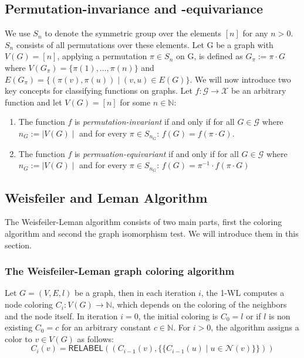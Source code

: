 \documentclass[11pt, dvipsnames, DIV=12]{scrreprt}
\theoremstyle{definition}
\newcommand{\MSopen}{\{\!\!\{}
\newcommand{\MSclose}{\}\!\!\}}
\begin{document}
\subsection{Permutation-invariance and -equivariance}
We use $S_n$ to denote the symmetric group over the elements $[n]$ for any $n > 0$. $S_n$ consists of all permutations over these elements. Let G be a graph with $V(G) = [n]$, applying a permutation $\pi \in S_n$ on G, is defined as $G_\pi := \pi \cdot G$ where $V(G_\pi) = \{\pi(1), \ldots, \pi(n) \}$ and $E(G_\pi) = \{ (\pi(v), \pi(u)) \mid (v,u) \in E(G)\}$. We will now introduce two key concepts for classifying functions on graphs. Let $f: \mathcal{G} \rightarrow \mathcal{X}$ be an arbitrary function and let $V(G) = [n]$ for some $n \in \mathbb{N}$:\\
\begin{enumerate}
    \item The function $f$ is \textit{permutation-invariant} if and only if for all $G \in \mathcal{G}$ where $n_G := \mid V(G) \mid$ and for every $\pi \in S_{n_G}$: $f(G) = f(\pi \cdot G)$.
    \item The function $f$ is \textit{permuation-equivariant} if and only if for all $G \in \mathcal{G}$ where $n_G := \mid V(G) \mid$ and for every $\pi \in S_{n_G}$: $f(G) = \pi^{-1} \cdot f(\pi \cdot G)$
\end{enumerate}


\subsection{Weisfeiler and Leman Algorithm}\label{sec:1-WL Definition}
The Weisfeiler-Leman algorithm consists of two main parts, first the coloring algorithm and second the graph isomorphism test. We will introduce them in this section.

\subsubsection{The Weisfeiler-Leman graph coloring algorithm}
Let $G = (V, E, l)$ be a graph, then in each iteration $i$, the 1-WL computes a node coloring $C_i: V(G) \rightarrow \mathbb{N}$, which depends on the coloring of the neighbors and the node itself. In iteration $i=0$, the initial coloring is $C_0 = l$ or if $l$ is non existing $C_0 = c$ for an arbitrary constant $c \in \mathbb{N}$. For $i > 0$, the algorithm assigns a color to $v \in V(G)$ as follows:
\begin{equation}
C_i (v) = \textsf{RELABEL}((C_{i-1}(v), \MSopen C_{i-1}(u) \mid u \in \mathcal{N}(v) \MSclose))
\end{equation}
\end{document}
